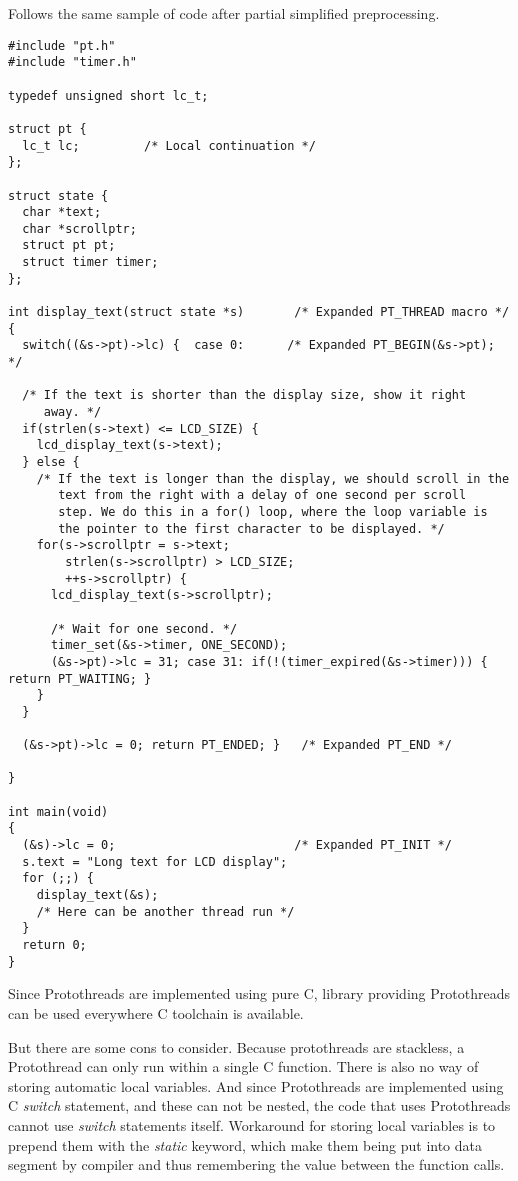 Follows the same sample of code after partial simplified preprocessing.

\begin{lstlisting}
#include "pt.h"
#include "timer.h"

typedef unsigned short lc_t;

struct pt {
  lc_t lc;         /* Local continuation */
}; 

struct state {
  char *text;
  char *scrollptr;
  struct pt pt;
  struct timer timer;
};
 
int display_text(struct state *s)       /* Expanded PT_THREAD macro */
{
  switch((&s->pt)->lc) {  case 0:      /* Expanded PT_BEGIN(&s->pt); */
 
  /* If the text is shorter than the display size, show it right
     away. */
  if(strlen(s->text) <= LCD_SIZE) {
    lcd_display_text(s->text);
  } else {    
    /* If the text is longer than the display, we should scroll in the
       text from the right with a delay of one second per scroll
       step. We do this in a for() loop, where the loop variable is
       the pointer to the first character to be displayed. */
    for(s->scrollptr = s->text;
        strlen(s->scrollptr) > LCD_SIZE;
        ++s->scrollptr) {
      lcd_display_text(s->scrollptr);
 
      /* Wait for one second. */
      timer_set(&s->timer, ONE_SECOND);
      (&s->pt)->lc = 31; case 31: if(!(timer_expired(&s->timer))) { return PT_WAITING; }
    }
  }
  
  (&s->pt)->lc = 0; return PT_ENDED; }   /* Expanded PT_END */
  
}

int main(void)
{
  (&s)->lc = 0;                         /* Expanded PT_INIT */
  s.text = "Long text for LCD display";
  for (;;) {
    display_text(&s);
    /* Here can be another thread run */
  }
  return 0;
}

\end{lstlisting}


Since Protothreads are implemented using pure C, library providing Protothreads can be used everywhere C toolchain is available.

But there are some cons to consider. Because protothreads are stackless, a Protothread can only run within a single C function.
There is also no way of storing automatic local variables. And since Protothreads are implemented using C {\it switch} statement, and these can
not be nested, the code that uses Protothreads cannot use {\it switch} statements itself.
Workaround for storing local variables is to prepend them with the {\it static} keyword, which make them being put into data segment
by compiler and thus remembering the value between the function calls.

